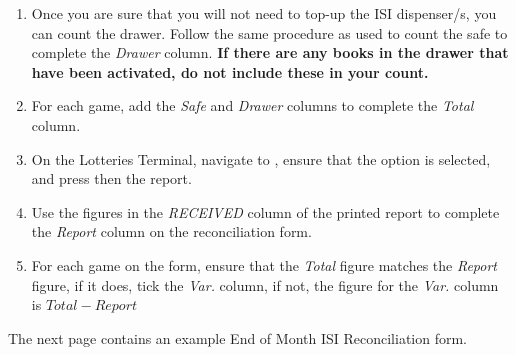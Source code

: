 \documentclass[a4paper, 12pt]{article}
\begin{document}
\begin{enumerate}
\begin{figure}[h]
\begin{subfigure}[b]{0.45\linewidth}
        \end{subfigure}
        \hfill
    \end{figure}
    \item Once you are sure that you will not need to top-up the ISI dispenser/s, you can count the drawer. Follow the same procedure as used to count the safe to complete the \textit{Drawer} column. \textbf{If there are any books in the drawer that have been activated, do not include these in your count.}
    \item For each game, add the \textit{Safe} and \textit{Drawer} columns to complete the \textit{Total} column.
    \item On the Lotteries Terminal, navigate to , ensure that the  option is selected, and press  then  the report.
    \item Use the figures in the \textit{RECEIVED} column of the printed report to complete the \textit{Report} column on the reconciliation form.
    \item For each game on the form, ensure that the \textit{Total} figure matches the \textit{Report} figure, if it does, tick the \textit{Var.} column, if not, the figure for the \textit{Var.} column is $Total - Report$
\end{enumerate}


The next page contains an example End of Month ISI Reconciliation form.


\end{document}
